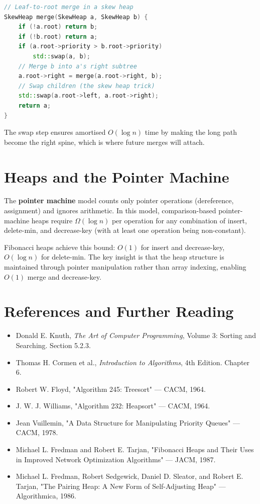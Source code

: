 \begin{lstlisting}[language=C++]
// Leaf-to-root merge in a skew heap
SkewHeap merge(SkewHeap a, SkewHeap b) {
    if (!a.root) return b;
    if (!b.root) return a;
    if (a.root->priority > b.root->priority)
        std::swap(a, b);
    // Merge b into a's right subtree
    a.root->right = merge(a.root->right, b);
    // Swap children (the skew heap trick)
    std::swap(a.root->left, a.root->right);
    return a;
}
\end{lstlisting}

The swap step ensures amortised $O(\log n)$ time by making the long path become the right spine, which is where future merges will attach.

\section{Heaps and the Pointer Machine}
\label{sec:heaps-pointer-machine}

The \textbf{pointer machine} model counts only pointer operations (dereference, assignment) and ignores arithmetic. In this model, comparison-based pointer-machine heaps require $\Omega(\log n)$ per operation for any combination of insert, delete-min, and decrease-key (with at least one operation being non-constant).

Fibonacci heaps achieve this bound: $O(1)$ for insert and decrease-key, $O(\log n)$ for delete-min. The key insight is that the heap structure is maintained through pointer manipulation rather than array indexing, enabling $O(1)$ merge and decrease-key.

\section{References and Further Reading}

\begin{itemize}
\item Donald E. Knuth, \textit{The Art of Computer Programming}, Volume 3: Sorting and Searching. Section 5.2.3.
\item Thomas H. Cormen et al., \textit{Introduction to Algorithms}, 4th Edition. Chapter 6.
\item Robert W. Floyd, "Algorithm 245: Treesort" — CACM, 1964.
\item J. W. J. Williams, "Algorithm 232: Heapsort" — CACM, 1964.
\item Jean Vuillemin, "A Data Structure for Manipulating Priority Queues" — CACM, 1978.
\item Michael L. Fredman and Robert E. Tarjan, "Fibonacci Heaps and Their Uses in Improved Network Optimization Algorithms" — JACM, 1987.
\item Michael L. Fredman, Robert Sedgewick, Daniel D. Sleator, and Robert E. Tarjan, "The Pairing Heap: A New Form of Self-Adjusting Heap" — Algorithmica, 1986.
\end{itemize}

